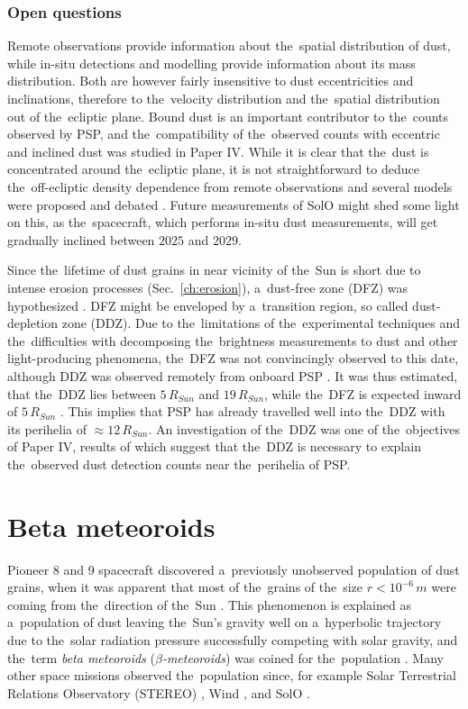 \subsubsection{Open questions}

Remote observations provide information about the~spatial distribution of dust, while in-situ detections and modelling provide information about its mass distribution. Both are however fairly insensitive to dust eccentricities and inclinations, therefore to the~velocity distribution and the~spatial distribution out of the~ecliptic plane. Bound dust is an important contributor to the~counts observed by PSP, and the~compatibility of the~observed counts with eccentric and inclined dust was studied in Paper IV. While it is clear that the~dust is concentrated around the~ecliptic plane, it is not straightforward to deduce the~off-ecliptic density dependence from remote observations and several models were proposed and debated \citep{giese1986three}. Future measurements of SolO might shed some light on this, as the~spacecraft, which performs in-situ dust measurements, will get gradually inclined between $2025$ and $2029$.

Since the~lifetime of dust grains in near vicinity of the~Sun is short due to intense erosion processes (Sec.~\ref{ch:erosion}), a~dust-free zone (DFZ) was hypothesized \citep{russell1929meteoric}. DFZ might be enveloped by a~transition region, so called dust-depletion zone (DDZ). Due to the~limitations of the~experimental techniques and the~difficulties with decomposing the~brightness measurements to dust and other light-producing phenomena, the~DFZ was not convincingly observed to this date, although DDZ was observed remotely from onboard PSP \citep{stenborg2018characterization}. It was thus estimated, that the~DDZ lies between $5 \, R_{Sun}$ and $19 \, R_{Sun}$, while the~DFZ is expected inward of $5 \, R_{Sun}$ \citep{stenborg2022psp}. This implies that PSP has already travelled well into the~DDZ with its perihelia of $\approx 12 \, R_{Sun}$. An investigation of the~DDZ was one of the~objectives of Paper IV, results of which suggest that the~DDZ is necessary to explain the~observed dust detection counts near the~perihelia of PSP.

\section{Beta meteoroids}

Pioneer 8 and 9 spacecraft discovered a~previously unobserved population of dust grains, when it was apparent that most of the~grains of the~size $r < 10^{-6} \, \si{m}$ were coming from the~direction of the~Sun \citep{berg1973evidence}. This phenomenon is explained as a~population of dust leaving the~Sun's gravity well on a~hyperbolic trajectory due to the~solar radiation pressure successfully competing with solar gravity, and the~term \textit{beta meteoroids} ($\beta$\textit{-meteoroids}) was coined for the~population \citep{zook1975source}. Many other space missions observed the~population since, for example Solar Terrestrial Relations Observatory ({STEREO}) \citep{zaslavsky2012interplanetary}, Wind \citep{malaspina2014interplanetary}, and SolO \cite{zaslavsky2021first}.

